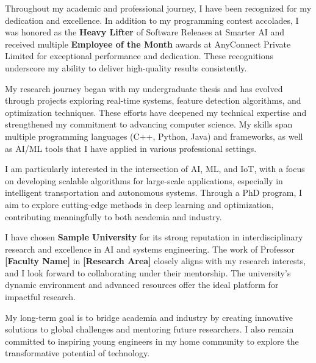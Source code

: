 \documentclass[11pt]{article}
\newif\ifshowsections
\begin{document}
Throughout my academic and professional journey, I have been recognized for my dedication and excellence.
In addition to my programming contest accolades, I was honored as the \textbf{Heavy Lifter} of Software Releases at
Smarter AI and received multiple \textbf{Employee of the Month} awards at AnyConnect Private Limited for exceptional
performance and dedication. These recognitions underscore my ability to deliver high-quality results consistently.

\ifshowsections\section*{Research Interests}\fi

My research journey began with my undergraduate thesis and has evolved through projects exploring real-time
systems, feature detection algorithms, and optimization techniques. These efforts have deepened my technical
expertise and strengthened my commitment to advancing computer science. My skills span multiple programming
languages (C++, Python, Java) and frameworks, as well as AI/ML tools that I have applied in various professional
settings.

I am particularly interested in the intersection of AI, ML, and IoT, with a focus on developing scalable algorithms
for large-scale applications, especially in intelligent transportation and autonomous systems. Through a PhD program,
I aim to explore cutting-edge methods in deep learning and optimization, contributing meaningfully to both academia
and industry.

\ifshowsections\section*{Motivation and Future Goals}\fi

I have chosen \textbf{Sample University} for its strong reputation in interdisciplinary research and excellence
in AI and systems engineering. The work of Professor \textbf{[Faculty Name]} in \textbf{[Research Area]} closely aligns
with my research interests, and I look forward to collaborating under their mentorship. The university’s dynamic
environment and advanced resources offer the ideal platform for impactful research.

My long-term goal is to bridge academia and industry by creating innovative solutions to global challenges and
mentoring future researchers. I also remain committed to inspiring young engineers in my home community to explore
the transformative potential of technology.
\end{document}
